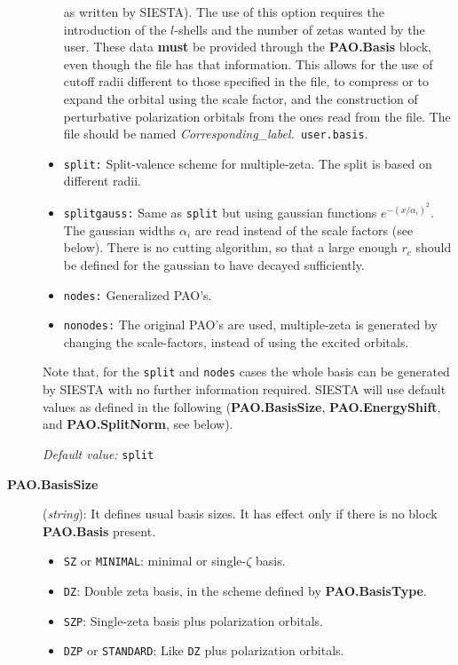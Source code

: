 \begin{description}
\begin{itemize}
as written by SIESTA). The use of this option requires the
introduction of the $l$-shells and the number of zetas wanted by the user. 
These data {\bf must} be provided through the {\bf PAO.Basis} block, 
even though the file has that information. This 
allows for the use of cutoff radii 
different to those specified in the file, to compress or to 
expand the orbital using the scale factor,
and the construction of perturbative 
polarization orbitals 
from the ones read from the file. 
The file should be named 
{\it Corresponding\_label.}{\tt 
user.basis}.
\item {\tt split:} Split-valence scheme for multiple-zeta.
The split is based on different radii. 
\item {\tt splitgauss:}
Same as {\tt split} but using gaussian functions
$e^{-(x/\alpha_i)^2}$. The gaussian widths $\alpha_i$ are read instead 
of the scale factors (see below). There is no cutting algorithm, so that
a large enough $r_c$ should be defined for the gaussian to have decayed
sufficiently.
\item {\tt nodes:} Generalized PAO's.
\item {\tt nonodes:} 
The original PAO's are used, multiple-zeta is generated
by changing the scale-factors, instead of using the excited orbitals. 
\end{itemize}
\noindent
Note that, for the {\tt split} and {\tt nodes} cases
the whole basis can be generated by SIESTA with no further information
required. SIESTA will use default values as defined in the following 
({\bf PAO.BasisSize},
{\bf PAO.EnergyShift}, and {\bf PAO.SplitNorm}, see below).

{\it Default value:} {\tt split}


\item[{\bf PAO.BasisSize}] ({\it string}): 
It defines usual basis sizes. It has effect only if there is no 
block {\bf PAO.Basis} present.
\begin{itemize}
\item {\tt SZ} or 
{\tt MINIMAL}: 
minimal or single-$\zeta$ basis.
\item {\tt DZ}: Double zeta basis, in the scheme defined by 
{\bf PAO.BasisType}.
\item {\tt SZP}: Single-zeta basis plus polarization 
orbitals.
\item {\tt DZP} or 
{\tt STANDARD}: 
Like {\tt DZ} plus polarization orbitals. 


\end{itemize}
\end{description}
